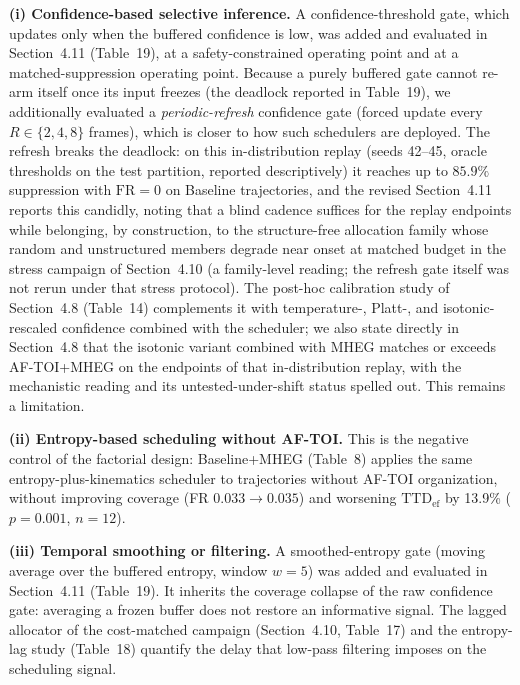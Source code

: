 \documentclass[1p,12pt,authoryear]{elsarticle}
\begin{document}
\vspace{2mm}
\noindent \textbf{(i) Confidence-based selective inference.} A confidence-threshold gate, which updates only when the buffered confidence is low, was added and evaluated in Section~4.11 (Table~19), at a safety-constrained operating point and at a matched-suppression operating point. Because a purely buffered gate cannot re-arm itself once its input freezes (the deadlock reported in Table~19), we additionally evaluated a \emph{periodic-refresh} confidence gate (forced update every $R \in \{2,4,8\}$ frames), which is closer to how such schedulers are deployed. The refresh breaks the deadlock: on this in-distribution replay (seeds 42--45, oracle thresholds on the test partition, reported descriptively) it reaches up to $85.9\%$ suppression with $\mathrm{FR}=0$ on Baseline trajectories, and the revised Section~4.11 reports this candidly, noting that a blind cadence suffices for the replay endpoints while belonging, by construction, to the structure-free allocation family whose random and unstructured members degrade near onset at matched budget in the stress campaign of Section~4.10 (a family-level reading; the refresh gate itself was not rerun under that stress protocol). The post-hoc calibration study of Section~4.8 (Table~14) complements it with temperature-, Platt-, and isotonic-rescaled confidence combined with the scheduler; we also state directly in Section~4.8 that the isotonic variant combined with MHEG matches or exceeds AF-TOI+MHEG on the endpoints of that in-distribution replay, with the mechanistic reading and its untested-under-shift status spelled out. This remains a limitation.

\vspace{2mm}
\noindent \textbf{(ii) Entropy-based scheduling without AF-TOI.} This is the negative control of the factorial design: Baseline+MHEG (Table~8) applies the same entropy-plus-kinematics scheduler to trajectories without AF-TOI organization, without improving coverage (FR $0.033 \rightarrow 0.035$) and worsening $\mathrm{TTD}_{\mathrm{ef}}$ by 13.9\% ($p=0.001$, $n=12$).

\vspace{2mm}
\noindent \textbf{(iii) Temporal smoothing or filtering.} A smoothed-entropy gate (moving average over the buffered entropy, window $w{=}5$) was added and evaluated in Section~4.11 (Table~19). It inherits the coverage collapse of the raw confidence gate: averaging a frozen buffer does not restore an informative signal. The lagged allocator of the cost-matched campaign (Section~4.10, Table~17) and the entropy-lag study (Table~18) quantify the delay that low-pass filtering imposes on the scheduling signal.
\end{document}
